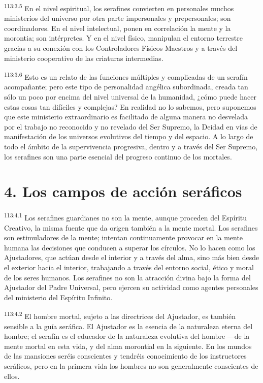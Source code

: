 \par
\textsuperscript{113:3.5} En el nivel espiritual, los serafines convierten en personales muchos ministerios del universo por otra parte impersonales y prepersonales; son coordinadores. En el nivel intelectual, ponen en correlación la mente y la morontia; son intérpretes. Y en el nivel físico, manipulan el entorno terrestre gracias a su conexión con los Controladores Físicos Maestros y a través del ministerio cooperativo de las criaturas intermedias.

\par
\textsuperscript{113:3.6} Esto es un relato de las funciones múltiples y complicadas de un serafín acompañante; pero este tipo de personalidad angélica subordinada, creada tan sólo un poco por encima del nivel universal de la humanidad, ¿cómo puede hacer estas cosas tan difíciles y complejas? En realidad no lo sabemos, pero suponemos que este ministerio extraordinario es facilitado de alguna manera no desvelada por el trabajo no reconocido y no revelado del Ser Supremo, la Deidad en vías de manifestación de los universos evolutivos del tiempo y del espacio. A lo largo de todo el ámbito de la supervivencia progresiva, dentro y a través del Ser Supremo, los serafines son una parte esencial del progreso continuo de los mortales.

\section*{4. Los campos de acción seráficos}
\par
\textsuperscript{113:4.1} Los serafines guardianes no son la mente, aunque proceden del Espíritu Creativo, la misma fuente que da origen también a la mente mortal. Los serafines son estimuladores de la mente; intentan continuamente provocar en la mente humana las decisiones que conducen a superar los círculos. No lo hacen como los Ajustadores, que actúan desde el interior y a través del alma, sino más bien desde el exterior hacia el interior, trabajando a través del entorno social, ético y moral de los seres humanos. Los serafines no son la atracción divina bajo la forma del Ajustador del Padre Universal, pero ejercen su actividad como agentes personales del ministerio del Espíritu Infinito.

\par
\textsuperscript{113:4.2} El hombre mortal, sujeto a las directrices del Ajustador, es también sensible a la guía seráfica. El Ajustador es la esencia de la naturaleza eterna del hombre; el serafín es el educador de la naturaleza evolutiva del hombre ---de la mente mortal en esta vida, y del alma morontial en la siguiente. En los mundos de las mansiones seréis conscientes y tendréis conocimiento de los instructores seráficos, pero en la primera vida los hombres no son generalmente conscientes de ellos.

